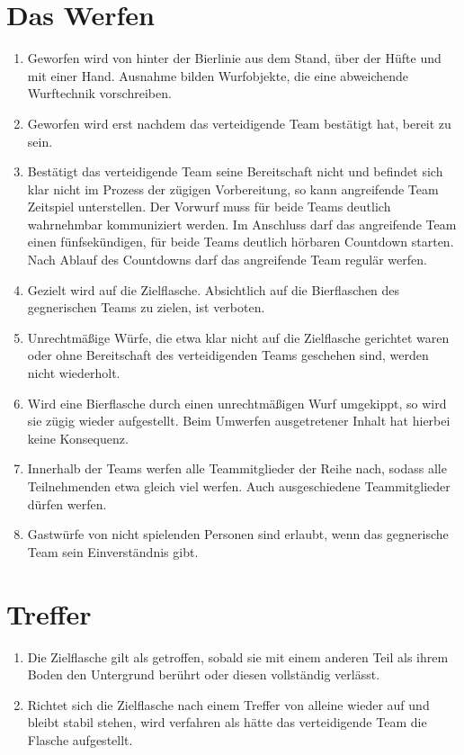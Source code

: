\section{Das Werfen}
\begin{enumerate}[label={(\arabic*)}]
    \item
    Geworfen wird von hinter der Bierlinie aus dem Stand, über der Hüfte und mit einer Hand.
    Ausnahme bilden Wurfobjekte, die eine abweichende Wurftechnik vorschreiben.

    \item
    Geworfen wird erst nachdem das verteidigende Team bestätigt hat, bereit zu sein.

    \item
    Bestätigt das verteidigende Team seine Bereitschaft nicht und befindet sich klar nicht im Prozess der zügigen Vorbereitung, so kann angreifende Team Zeitspiel unterstellen.
    Der Vorwurf muss für beide Teams deutlich wahrnehmbar kommuniziert werden.
    Im Anschluss darf das angreifende Team einen fünfsekündigen, für beide Teams deutlich hörbaren Countdown starten.
    Nach Ablauf des Countdowns darf das angreifende Team regulär werfen.

    \item
    Gezielt wird auf die Zielflasche.
    Absichtlich auf die Bierflaschen des gegnerischen Teams zu zielen, ist verboten.

    \item
    Unrechtmäßige Würfe, die etwa klar nicht auf die Zielflasche gerichtet waren oder ohne Bereitschaft des verteidigenden Teams geschehen sind, werden nicht wiederholt.

    \item
    Wird eine Bierflasche durch einen unrechtmäßigen Wurf umgekippt, so wird sie zügig wieder aufgestellt.
    Beim Umwerfen ausgetretener Inhalt hat hierbei keine Konsequenz.

    \item
    Innerhalb der Teams werfen alle Teammitglieder der Reihe nach, sodass alle Teilnehmenden etwa gleich viel werfen.
    Auch ausgeschiedene Teammitglieder dürfen werfen.

    \item
    Gastwürfe von nicht spielenden Personen sind erlaubt, wenn das gegnerische Team sein Einverständnis gibt.
\end{enumerate}

\section{Treffer}
\begin{enumerate}[label={(\arabic*)}]
    \item\label{Flunkyball:Treffer:Allg}
    Die Zielflasche gilt als getroffen, sobald sie mit einem anderen Teil als ihrem Boden den Untergrund berührt oder diesen vollständig verlässt.

    \item 
    Richtet sich die Zielflasche nach einem Treffer von alleine wieder auf und bleibt stabil stehen, wird verfahren als hätte das verteidigende Team die Flasche aufgestellt.
\end{enumerate}

